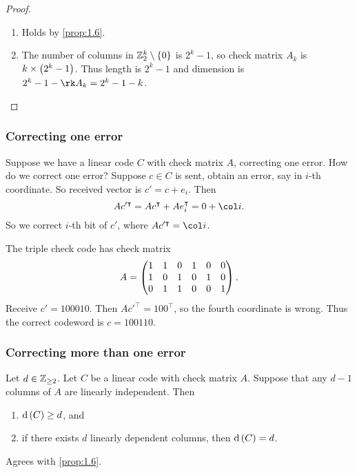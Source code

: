 \begin{proof}
\hfill
\begin{enumerate}
\item Holds by \ref{prop:1.6}.
\item The number of columns in $ \ZZ_2^k \setminus \cbr{0} $ is $ 2^k - 1 $, so check matrix $ A_k $ is $ k \times \br{2^k - 1} $. Thus length is $ 2^k - 1 $ and dimension is $ 2^k - 1 - \rk A_k = 2^k - 1 - k $.
\end{enumerate}
\end{proof}

\subsubsection{Correcting one error}

Suppose we have a linear code $ C $ with check matrix $ A $, correcting one error. How do we correct one error? Suppose $ c \in C $ is sent, obtain an error, say in $ i $-th coordinate. So received vector is $ c' = c + e_i $. Then
$$ Ac'^\intercal = Ac^\intercal + Ae_i^\intercal = 0 + \col i. $$
So we correct $ i $-th bit of $ c' $, where $ Ac'^\intercal = \col i $.

\begin{example*}
The triple check code has check matrix
$$ A = \begin{pmatrix} 1 & 1 & 0 & 1 & 0 & 0 \\ 1 & 0 & 1 & 0 & 1 & 0 \\ 0 & 1 & 1 & 0 & 0 & 1 \end{pmatrix}. $$
Receive $ c' = 100010 $. Then $ Ac'^\intercal = 100^\intercal $, so the fourth coordinate is wrong. Thus the correct codeword is $ c = 100110 $.
\end{example*}

\subsubsection{Correcting more than one error}

\begin{proposition}
\label{prop:1.8}
Let $ d \in \mathbb{Z}_{\ge 2} $. Let $ C $ be a linear code with check matrix $ A $. Suppose that any $ d - 1 $ columns of $ A $ are linearly independent. Then
\begin{enumerate}
\item $ \d\br{C} \ge d $, and
\item if there exists $ d $ linearly dependent columns, then $ \d\br{C} = d $.
\end{enumerate}
\end{proposition}

\begin{note*}
Agrees with \ref{prop:1.6}.
\end{note*}

